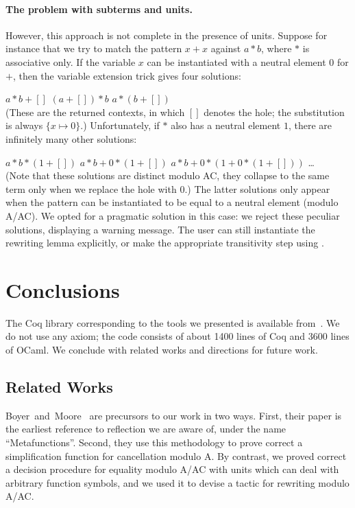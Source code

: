 \documentclass{llncs}
\begin{document}
\paragraph{The problem with subterms and units.}
\label{ssec:subtermunit}

However, this approach is not complete in the presence of
units. Suppose for instance that we try to match the pattern $x+x$
against $a*b$, where $*$ is associative only. If the variable $x$
can be instantiated with a neutral element $0$ for $+$, then the
variable extension trick gives four solutions:

\smallskip\hfill
 $a*b+[]$ \qquad\quad $(a+[])*b$ \qquad\quad $a*(b+[])$
\hfill\smallskip\\
(These are the returned contexts, in which $[]$ denotes the hole; the
substitution is always $\{x\mapsto 0\}$.) Unfortunately, if $*$ also
has a neutral element $1$, there are infinitely many other solutions:

\smallskip\hfill $a*b*(1+[])$ \qquad $a*b+0*(1+[])$ \qquad
$a*b+0*(1+0*(1+[]))$ \qquad \dots\quad
\hfill\smallskip\\
(Note that these solutions are distinct modulo AC, they collapse to
the same term only when we replace the hole with $0$.)  The latter
solutions only appear when the pattern can be instantiated to be equal
to a neutral element (modulo A/AC). We opted for a pragmatic solution
in this case: we reject these peculiar solutions, displaying a warning
message. The user can still instantiate the rewriting lemma
explicitly, or make the appropriate transitivity step using \tac.


\section{Conclusions}
\label{sec:conclusion}

The Coq library corresponding to the tools we presented is available
from~\cite{aac:web}. We do not use any axiom; the code consists of
about 1400 lines of Coq and 3600 lines of OCaml. We conclude with
related works and directions for future work.

\subsection{Related Works}
\label{ssec:related}

Boyer~and~Moore~\cite{BoyerMoore81} are precursors to our work in two
ways. First, their paper is the earliest reference to reflection we
are aware of, under the name ``Metafunctions''. Second, they use this
methodology to prove correct a simplification function for
cancellation modulo A.
By contrast, we proved correct a decision procedure for equality
modulo A/AC with units which can deal with arbitrary function symbols,
and we used it to devise a tactic for rewriting modulo A/AC.
\end{document}
